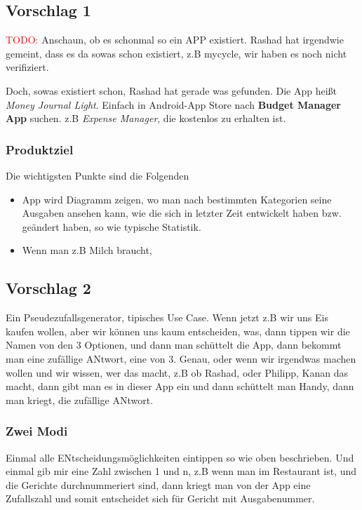 \subsection{Vorschlag 1}


\textcolor{red}{TODO:} Anschaun, ob es schonmal so ein APP existiert. Rashad hat irgendwie gemeint, dass es da sowas schon existiert, z.B mycycle, wir haben es noch nicht verifiziert. 

\vspace{0.2cm}

Doch, sowas existiert schon, Rashad hat gerade was gefunden. Die App heißt \emph{Money Journal Light}. Einfach in Android-App Store nach \textbf{Budget Manager App} suchen. z.B \emph{Expense Manager}, die kostenlos zu erhalten ist. 


\subsubsection{Produktziel} 
Die wichtigsten Punkte sind die Folgenden
\begin{itemize}
\item App wird Diagramm zeigen, wo man nach bestimmten Kategorien seine Ausgaben ansehen kann, wie die sich in letzter Zeit entwickelt haben bzw. geändert haben, so wie typische Statistik.
\item Wenn man z.B Milch braucht, 
\end{itemize}


\subsection{Vorschlag 2}
Ein Pseudezufallsgenerator, tipisches Use Case. Wenn jetzt z.B wir uns Eis kaufen wollen, aber wir können uns kaum entscheiden, was, dann tippen wir die Namen von den 3 Optionen, und dann man schüttelt die App, dann bekommt man eine zufällige ANtwort, eine von 3. Genau, oder wenn wir irgendwas machen wollen und wir wissen, wer das macht, z.B ob Rashad, oder Philipp, Kanan das macht, dann gibt man es in dieser App ein und dann schüttelt man Handy, dann man kriegt, die zufällige ANtwort. 


\subsubsection{Zwei Modi}
Einmal alle ENtscheidungsmöglichkeiten eintippen so wie oben beschrieben. Und einmal gib mir eine Zahl zwischen 1 und n, z.B wenn man im Restaurant ist, und die Gerichte durchnummeriert sind, dann kriegt man von der App eine Zufallszahl und somit entscheidet sich für Gericht mit Ausgabenummer. 


